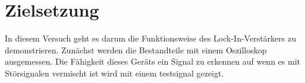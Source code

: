 \section{Zielsetzung}
In diesem Versuch geht es darum die Funktionsweise des Lock-In-Verstärkers zu demonstrieren.
Zunächst werden die Bestandteile mit einem Oszilloskop ausgemessen.
Die Fähigkeit dieses Geräts ein Signal zu erkennen auf wenn es mit Störsignalen vermischt ist wird mit einem testsignal gezeigt.